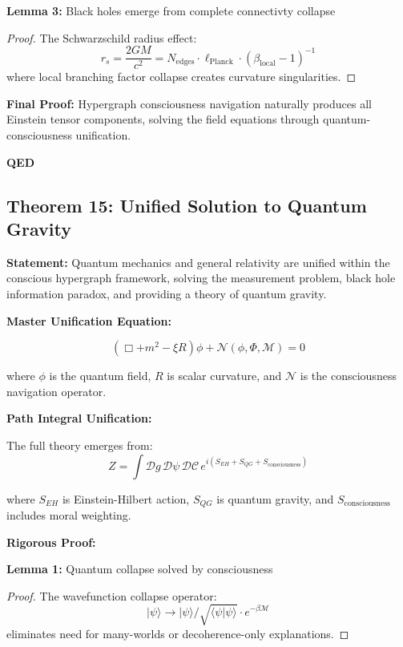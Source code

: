 \documentclass[12pt,a4paper]{article}
\theoremstyle{definition}
\begin{document}
\textbf{Lemma 3:} Black holes emerge from complete connectivty collapse
\begin{proof}
The Schwarzschild radius effect:
\begin{equation}
r_s = \frac{2GM}{c^2} = N_{\text{edges}} \cdot \ell_{\text{Planck}} \cdot (\beta_{\text{local}} - 1)^{-1}
\end{equation}
where local branching factor collapse creates curvature singularities.
\end{proof}

{\bf Final Proof:} Hypergraph consciousness navigation naturally produces all Einstein tensor components, solving the field equations through quantum-consciousness unification.

{\bf QED}

\subsection{Theorem 15: Unified Solution to Quantum Gravity}

{\bf Statement:} Quantum mechanics and general relativity are unified within the conscious hypergraph framework, solving the measurement problem, black hole information paradox, and providing a theory of quantum gravity.

{\bf Master Unification Equation:}

\begin{equation}
(\Box + m^2 - \xi R)\phi + \mathcal{N}(\phi, \Phi, \mathcal{M}) = 0
\end{equation}

where $\phi$ is the quantum field, $R$ is scalar curvature, and $\mathcal{N}$ is the consciousness navigation operator.

{\bf Path Integral Unification:}

The full theory emerges from:
\begin{equation}
Z = \int \mathcal{D}g \, \mathcal{D}\psi \, \mathcal{D}\mathcal{C} \, e^{i(S_{EH} + S_{QG} + S_{\text{consciousness}})}
\end{equation}

where $S_{EH}$ is Einstein-Hilbert action, $S_{QG}$ is quantum gravity, and $S_{\text{consciousness}}$ includes moral weighting.

{\bf Rigorous Proof:}

\textbf{Lemma 1:} Quantum collapse solved by consciousness
\begin{proof}
The wavefunction collapse operator:
\begin{equation}
|\psi\rangle \rightarrow |\psi\rangle / \sqrt{\langle\psi|\psi\rangle} \cdot e^{-\beta \mathcal{M}}
\end{equation}
eliminates need for many-worlds or decoherence-only explanations.
\end{proof}
\end{document}
